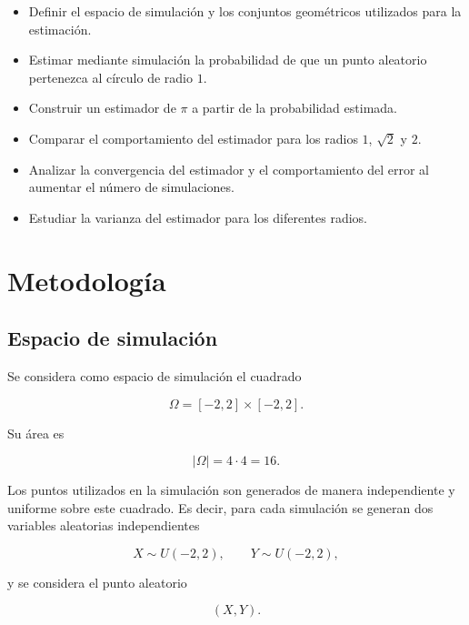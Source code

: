 \documentclass[12pt,a4paper]{article}
\begin{document}
\begin{itemize}

    \item Definir el espacio de simulación y los conjuntos geométricos
    utilizados para la estimación.

    \item Estimar mediante simulación la probabilidad de que un punto
    aleatorio pertenezca al círculo de radio \(1\).

    \item Construir un estimador de \(\pi\) a partir de la probabilidad
    estimada.

    \item Comparar el comportamiento del estimador para los radios
    \(1\), \(\sqrt{2}\) y \(2\).

    \item Analizar la convergencia del estimador y el comportamiento
    del error al aumentar el número de simulaciones.

    \item Estudiar la varianza del estimador para los diferentes radios.

\end{itemize}


\section{Metodología}

\subsection{Espacio de simulación}

Se considera como espacio de simulación el cuadrado

\[
\Omega=[-2,2]\times[-2,2].
\]

Su área es

\[
|\Omega|=4\cdot4=16.
\]

Los puntos utilizados en la simulación son generados de manera
independiente y uniforme sobre este cuadrado. Es decir, para cada
simulación se generan dos variables aleatorias independientes

\[
X\sim U(-2,2),
\qquad
Y\sim U(-2,2),
\]

y se considera el punto aleatorio

\[
(X,Y).
\]
\end{document}
